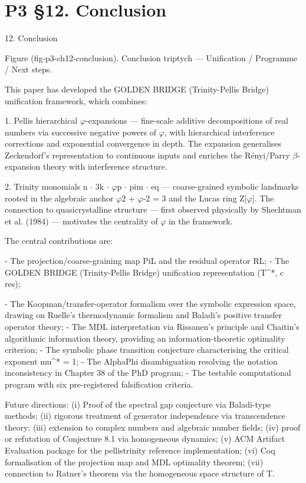 
\section{P3 §12. Conclusion}

12. Conclusion

      Figure (fig-p3-ch12-conclusion). Conclusion triptych --- Unification / Programme / Next steps.

  This paper has developed the GOLDEN BRIDGE (Trinity-Pellis Bridge) unification framework, which combines:

  1. Pellis hierarchical $\varphi$-expansions --- fine-scale additive decompositions of real numbers
  via successive negative powers of $\varphi$, with hierarchical interference corrections and
  exponential convergence in depth. The expansion generalises Zeckendorf's
  representation to continuous inputs and enriches the Rényi/Parry $\beta$-expansion theory
  with interference structure.

  2. Trinity monomials n $\cdot$ 3k $\cdot$ $\varphi$p $\cdot$ pim $\cdot$ eq --- coarse-grained symbolic landmarks rooted
  in the algebraic anchor $\varphi$2 + $\varphi$-2 = 3 and the Lucas ring Z[$\varphi$]. The connection to
  quasicrystalline structure --- first observed physically by Shechtman et al. (1984) ---
  motivates the centrality of $\varphi$ in the framework.

  The central contributions are:

  - The projection/coarse-graining map PiL and the residual operator RL;
  - The GOLDEN BRIDGE (Trinity-Pellis Bridge) unification representation (T\textasciicircum{}*, c res);

  - The Koopman/transfer-operator formalism over the symbolic expression space,
  drawing on Ruelle's thermodynamic formalism and Baladi's positive transfer operator
  theory;
  - The MDL interpretation via Rissanen's principle and Chaitin's algorithmic information
  theory, providing an information-theoretic optimality criterion;
  - The symbolic phase transition conjecture characterising the critical exponent mu\textasciicircum{}* =
  1;
  - The AlphaPhi disambiguation resolving the notation inconsistency in Chapter 38 of the
  PhD program;
  - The testable computational program with six pre-registered falsification criteria.

  Future directions: (i) Proof of the spectral gap conjecture via Baladi-type methods; (ii)
  rigorous treatment of generator independence via transcendence theory; (iii) extension
  to complex numbers and algebraic number fields; (iv) proof or refutation of Conjecture
  8.1 via homogeneous dynamics; (v) ACM Artifact Evaluation package for the
  pellistrinity reference implementation; (vi) Coq formalisation of the projection map and
  MDL optimality theorem; (vii) connection to Ratner's theorem via the homogeneous
  space structure of T.

